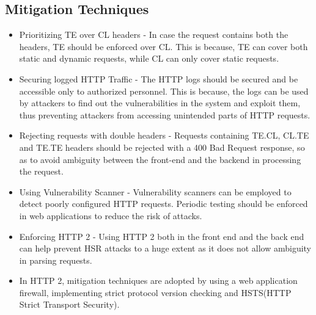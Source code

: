 \documentclass[conference]{IEEEtran}
\begin{document}
\subsection*{Mitigation Techniques}
\begin{itemize}
	\item Prioritizing TE over CL headers - In case the request contains both the headers, TE should be enforced over CL. This is because, TE can cover both static and dynamic requests, while CL can only cover static requests.
	\item Securing logged HTTP Traffic - The HTTP logs should be secured and be accessible only to authorized personnel. This is because, the logs can be used by attackers to find out the vulnerabilities in the system and exploit them, thus preventing attackers from accessing unintended parts of HTTP requests.
	\item Rejecting requests with double headers - Requests containing TE.CL, CL.TE and TE.TE headers should be rejected with a 400 Bad Request response, so as to avoid ambiguity between the front-end and the backend in processing the request.
	\item Using Vulnerability Scanner -  Vulnerability scanners can be employed to detect poorly configured HTTP requests. Periodic testing should be enforced in web applications to reduce the risk of attacks.
	\item Enforcing HTTP 2 - Using HTTP 2 both in the front end and the back end can help prevent HSR attacks to a huge extent as it does not allow ambiguity in parsing requests.
	\item In HTTP 2, mitigation techniques are adopted by using a web application firewall, implementing strict protocol version checking and HSTS(HTTP Strict Transport Security).
\end{itemize}
\end{document}
